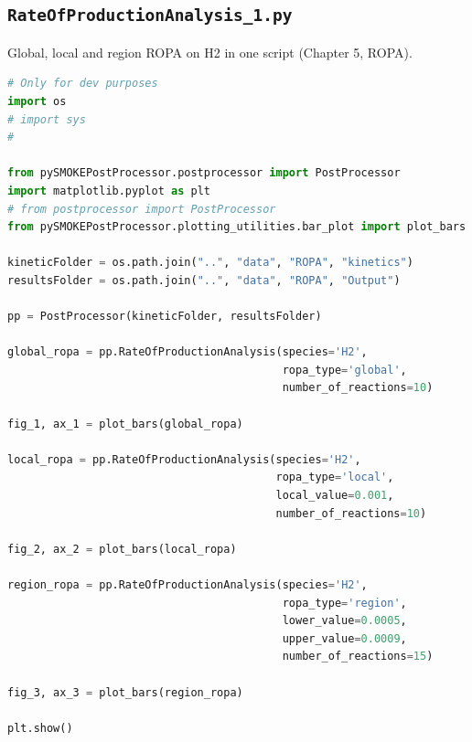 \documentclass[11pt,a4paper]{report}
\begin{document}
\subsection{\texttt{RateOfProductionAnalysis\_1.py}}
Global, local and region ROPA on H2 in one script (Chapter 5, ROPA).
\begin{lstlisting}[language=Python]
# Only for dev purposes
import os
# import sys
#

from pySMOKEPostProcessor.postprocessor import PostProcessor
import matplotlib.pyplot as plt
# from postprocessor import PostProcessor
from pySMOKEPostProcessor.plotting_utilities.bar_plot import plot_bars

kineticFolder = os.path.join("..", "data", "ROPA", "kinetics")
resultsFolder = os.path.join("..", "data", "ROPA", "Output")

pp = PostProcessor(kineticFolder, resultsFolder)

global_ropa = pp.RateOfProductionAnalysis(species='H2',
                                          ropa_type='global',
                                          number_of_reactions=10)

fig_1, ax_1 = plot_bars(global_ropa)

local_ropa = pp.RateOfProductionAnalysis(species='H2',
                                         ropa_type='local',
                                         local_value=0.001,
                                         number_of_reactions=10)

fig_2, ax_2 = plot_bars(local_ropa)

region_ropa = pp.RateOfProductionAnalysis(species='H2',
                                          ropa_type='region',
                                          lower_value=0.0005,
                                          upper_value=0.0009,
                                          number_of_reactions=15)

fig_3, ax_3 = plot_bars(region_ropa)

plt.show()
\end{lstlisting}
\end{document}
